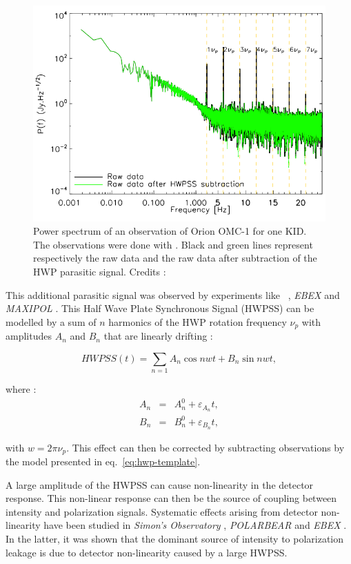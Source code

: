 \begin{figure}[h]
\center
\includegraphics[clip, angle=0, width=\columnwidth]{Figures/hwp_power_spectrum.png}
\caption{Power spectrum of an observation of Orion OMC-1 for one KID. The observations were done with \nika . Black and green lines represent respectively the raw data and the raw data after subtraction of the HWP parasitic signal. Credits : \citet{2017A&A...599A..34R} }
\label{fig:hwp_power_spectrum}
\end{figure}

This additional parasitic signal was observed by experiments like \ , \emph{EBEX} \citep{2010SPIE.7741E..1CR} and \emph{MAXIPOL} \citep{2007ApJ...665...42J}. This Half Wave Plate Synchronous Signal (HWPSS) can be modelled by a sum of $n$ harmonics of the HWP rotation frequency $\nu_{p}$ with amplitudes $A_{n}$ and $B_{n}$ that are linearly drifting :

\begin{equation}
HWPSS(t) = \sum_{n=1} A_{n} \cos nwt + B_{n} \sin nwt , 
\label{eq:hwp-template}
\end{equation}

where : 
\begin{eqnarray}
A_{n}  &=& A_{n}^{0} + \varepsilon_{A_{n}}t,\\
B_{n}  &=& B_{n}^{0} + \varepsilon_{B_{n}}t, 
\end{eqnarray}

with $w = 2 \pi \nu_{p}$.
This effect can then be corrected by subtracting observations by the model presented in eq.~\ref{eq:hwp-template}. 

A large amplitude of the HWPSS can cause non-linearity in the detector response. This non-linear response can then be the source of coupling between intensity and polarization signals. Systematic effects arising from detector non-linearity have been studied in \emph{Simon's Observatory} \citep{2018SPIE10708E..48S}, \emph{POLARBEAR} \citep{2017JCAP...05..008T} and \emph{EBEX} \citep{2017arXiv171101314D}. In the latter, it was shown that the dominant source of intensity to polarization leakage is due to detector non-linearity caused by a large HWPSS. 

